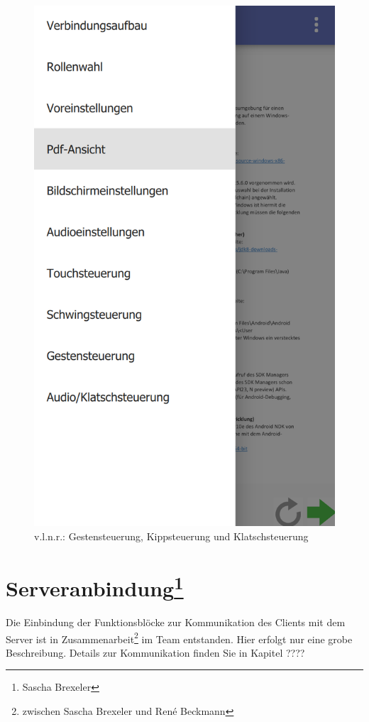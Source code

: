 \begin{figure}[ht!]
\begin{minipage}{0.31\linewidth}
		\includegraphics[scale=0.5]{GUI/Bilder/6_Menu-Button_Drawer_mit_Listview.PNG}
	\end{minipage}
	\caption{v.l.n.r.: Gestensteuerung, Kippsteuerung und Klatschsteuerung{\tiny}}
	\label{client:InformationenBedienhilfen}
\end{figure}


\section[Serveranbindung]{Serveranbindung\footnote{Sascha Brexeler}}
\label{client_Serveranbindung}
Die Einbindung der Funktionsblöcke zur Kommunikation des Clients mit dem Server ist in Zusammenarbeit\footnote{zwischen Sascha Brexeler und René Beckmann} im Team entstanden. Hier erfolgt nur eine grobe Beschreibung. Details zur Kommunikation finden Sie in Kapitel ????


